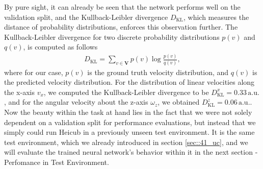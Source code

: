 By pure sight, it can already be seen that the network performs well on the validation split, and the Kullback-Leibler divergence $D_\text{KL}$, which measures the distance of probability distributions, enforces this observation further. The Kullback-Leibler divergence for two discrete probability distributions $p(v)$ and $q(v)$, is computed as follows
\begin{align}
	D_\text{KL} = \sum_{v\in \bm{V}}p(v)\log\frac{p(v)}{q(v)},
\end{align}
where for our case, $p(v)$ is the ground truth velocity distribution, and $q(v)$ is the predicted velocity distribution. For the distribution of linear velocities along the x-axis $v_x$, we computed the Kullback-Leibler divergence to be $D^x_\text{KL}=0.33\,\text{a.u.}$, and for the angular velocity about the z-axis $\omega_z$, we obtained $D^z_\text{KL}=0.06\,\text{a.u.}$. Now the beauty within the task at hand lies in the fact that we were not solely dependent on a validation split for performance evaluations, but instead that we simply could run Heicub in a previously unseen test environment. It is the same test environment, which we already introduced in section \ref{sec::41_uc}, and we will evaluate the trained neural network's behavior within it in the next section - Perfomance in Test Environment.
\FloatBarrier
